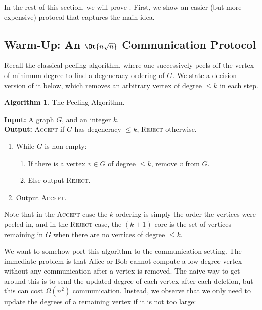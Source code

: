 \documentclass[11pt,letterpaper]{article}
\renewcommand{\leq}{\leqslant}
\theoremstyle{definition}
\newtheorem{algocf}{Algorithm}
\newenvironment{Algorithm}{\begin{abox}\begin{algocf}}{\end{algocf}\end{abox}}
\newenvironment{abox}{\begin{tcolorbox}[
		enlarge top by=5pt,
		enlarge bottom by=5pt,
		breakable,
		frame hidden,
		overlay broken = {
			\draw[line width=1pt, black]
			(frame.north west) rectangle (frame.south east);},
		overlay = {
			\draw[line width=1pt, black]
			(frame.north west) rectangle (frame.south east);},
		boxsep=0pt,
		left=4pt,
		right=4pt,
		top=10pt,
		arc=0pt,
		boxrule=1pt,toprule=1pt,
		colback=white
	]}
{\end{tcolorbox}}
\newcommand{\degen}{\textnormal{\textsf{DEGEN}}}
\newcommand{\fail}{\textsc{Reject}}
\newcommand{\true}{\textsc{Accept}}
\begin{document}
In the rest of this section, we will prove .
First, we show an easier (but more expensive) protocol that captures the main
idea.

\subsection{Warm-Up: An \texorpdfstring{$\Ot{n\sqrt{n}}$}{Õ(n sqrt n)} Communication Protocol}\label{sec:nrootn}
Recall the classical peeling algorithm, where one successively peels off the
vertex of minimum degree to find a degeneracy ordering of $G$.
We state a decision version of it below, which removes an arbitrary vertex of
degree $\leq k$ in each step.

\begin{Algorithm}\label{alg:peeling}
  The Peeling Algorithm. \medskip

  \textbf{Input:} A graph $G$, and an integer $k$.\\
  \textbf{Output:} \true{} if $G$ has degeneracy $\leq k$, \fail{} otherwise.

  \begin{enumerate}
    \item While $G$ is non-empty:
      \begin{enumerate}
        \item If there is a vertex $v \in G$ of degree $\leq k$,
          remove $v$ from $G$.
        \item Else output \fail.
      \end{enumerate}
    \item Output \true.
  \end{enumerate}
\end{Algorithm}

Note that in the \true{} case the $k$-ordering is simply the order the vertices
were peeled in, and in the \fail{} case, the $(k + 1)$-core is the set of vertices
remaining in $G$ when there are no vertices of degree $\leq k$.

We want to somehow port this algorithm to the communication setting.
The immediate problem is that Alice or Bob cannot compute a low degree
vertex without any communication after a vertex is removed.
The naive way to get around this is to send the updated degree of each
vertex after each deletion, but this can cost $\Omega(n^2)$ communication.
Instead, we observe that we only need to update the degrees of a remaining
vertex if it is not too large:
\end{document}
